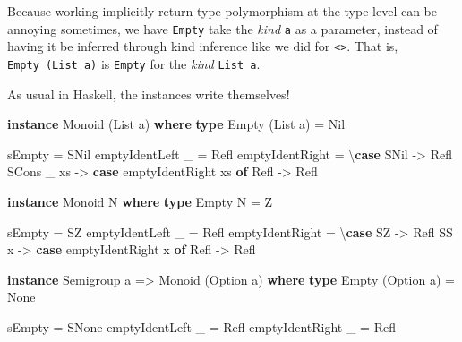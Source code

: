 \documentclass[]{article}
\newenvironment{Shaded}{\begin{snugshade}}{\end{snugshade}}
\newcommand{\DataTypeTok}[1]{\textcolor[rgb]{0.13,0.29,0.53}{#1}}
\newcommand{\FunctionTok}[1]{\textcolor[rgb]{0.00,0.00,0.00}{#1}}
\newcommand{\KeywordTok}[1]{\textcolor[rgb]{0.13,0.29,0.53}{\textbf{#1}}}
\newcommand{\NormalTok}[1]{#1}
\newcommand{\OtherTok}[1]{\textcolor[rgb]{0.56,0.35,0.01}{#1}}
\begin{document}
Because working implicitly return-type polymorphism at the type level can be
annoying sometimes, we have \texttt{Empty} take the \emph{kind} \texttt{a} as a
parameter, instead of having it be inferred through kind inference like we did
for \texttt{\textless{}\textgreater{}}. That is, \texttt{Empty\ (List\ a)} is
\texttt{Empty} for the \emph{kind} \texttt{List\ a}.

As usual in Haskell, the instances write themselves!

\begin{Shaded}
\begin{Highlighting}[]
\KeywordTok{instance} \DataTypeTok{Monoid}\NormalTok{ (}\DataTypeTok{List}\NormalTok{ a) }\KeywordTok{where}
    \KeywordTok{type} \DataTypeTok{Empty}\NormalTok{ (}\DataTypeTok{List}\NormalTok{ a) }\FunctionTok{=} \DataTypeTok{Nil}

\NormalTok{    sEmpty }\FunctionTok{=} \DataTypeTok{SNil}
\NormalTok{    emptyIdentLeft _ }\FunctionTok{=} \DataTypeTok{Refl}
\NormalTok{    emptyIdentRight  }\FunctionTok{=}\NormalTok{ \textbackslash{}}\KeywordTok{case}
      \DataTypeTok{SNil} \OtherTok{->} \DataTypeTok{Refl}
      \DataTypeTok{SCons}\NormalTok{ _ xs }\OtherTok{->}
        \KeywordTok{case}\NormalTok{ emptyIdentRight xs }\KeywordTok{of}
          \DataTypeTok{Refl} \OtherTok{->} \DataTypeTok{Refl}

\KeywordTok{instance} \DataTypeTok{Monoid} \DataTypeTok{N} \KeywordTok{where}
    \KeywordTok{type} \DataTypeTok{Empty} \DataTypeTok{N} \FunctionTok{=} \DataTypeTok{Z}

\NormalTok{    sEmpty }\FunctionTok{=} \DataTypeTok{SZ}
\NormalTok{    emptyIdentLeft _ }\FunctionTok{=} \DataTypeTok{Refl}
\NormalTok{    emptyIdentRight  }\FunctionTok{=}\NormalTok{ \textbackslash{}}\KeywordTok{case}
      \DataTypeTok{SZ} \OtherTok{->} \DataTypeTok{Refl}
      \DataTypeTok{SS}\NormalTok{ x }\OtherTok{->} \KeywordTok{case}\NormalTok{ emptyIdentRight x }\KeywordTok{of}
        \DataTypeTok{Refl} \OtherTok{->} \DataTypeTok{Refl}

\KeywordTok{instance} \DataTypeTok{Semigroup}\NormalTok{ a }\OtherTok{=>} \DataTypeTok{Monoid}\NormalTok{ (}\DataTypeTok{Option}\NormalTok{ a) }\KeywordTok{where}
    \KeywordTok{type} \DataTypeTok{Empty}\NormalTok{ (}\DataTypeTok{Option}\NormalTok{ a) }\FunctionTok{=} \DataTypeTok{None}

\NormalTok{    sEmpty }\FunctionTok{=} \DataTypeTok{SNone}
\NormalTok{    emptyIdentLeft  _ }\FunctionTok{=} \DataTypeTok{Refl}
\NormalTok{    emptyIdentRight _ }\FunctionTok{=} \DataTypeTok{Refl}
\end{Highlighting}
\end{Shaded}
\end{document}
